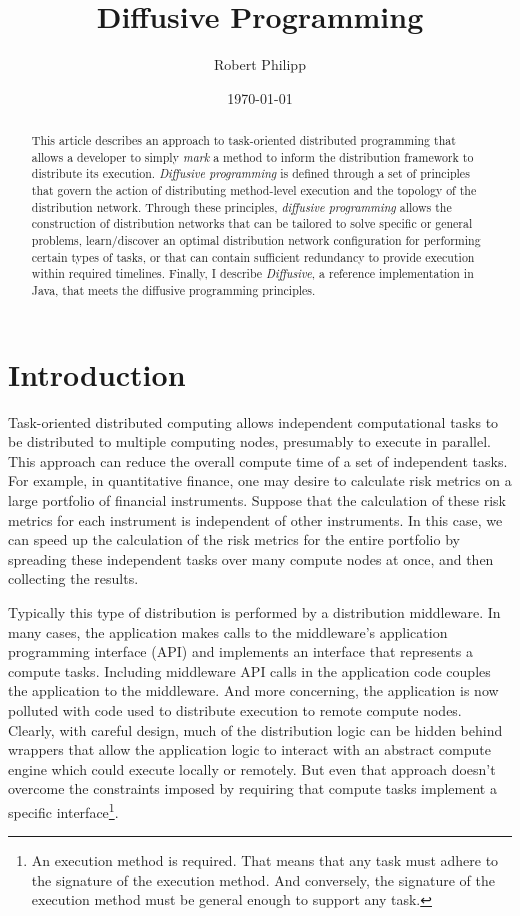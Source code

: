 \documentclass[11pt]{article}
\begin{document}
\title{Diffusive Programming}
\author{Robert Philipp}
\date{\today}
\maketitle

%
%
\begin{abstract}
This article describes an approach to task-oriented distributed programming that allows a developer to simply \emph{mark} a method to inform the distribution framework to distribute its execution. \emph{Diffusive programming} is defined through a set of principles that govern the action of distributing method-level execution and the topology of the distribution network. Through these principles, \emph{diffusive programming} allows the construction of distribution networks that can be tailored to solve specific or general problems,  learn/discover an optimal distribution network configuration for performing certain types of tasks, or that can contain sufficient redundancy to provide execution within required timelines. Finally, I describe \emph{Diffusive}, a reference implementation in Java, that meets the diffusive programming principles.
\end{abstract}

%
%
\section{Introduction}
Task-oriented distributed computing allows independent computational tasks to be distributed to multiple computing nodes, presumably to execute in parallel. This approach can reduce the overall compute time of a set of independent tasks. For example, in quantitative finance, one may desire to calculate risk metrics on a large portfolio of financial instruments. Suppose that the calculation of these risk metrics for each instrument is independent of other instruments. In this case, we can speed up the calculation of the risk metrics for the entire portfolio by spreading these independent tasks over many compute nodes at once, and then collecting the results.

Typically this type of distribution is performed by a distribution middleware. In many cases, the application makes calls to the middleware's application programming interface (API) and implements an interface that represents a compute tasks. Including middleware API calls in the application code couples the application to the middleware. And more concerning, the application is now polluted with code used to distribute execution to remote compute nodes. Clearly, with careful design, much of the distribution logic can be hidden behind wrappers that allow the application logic to interact with an abstract compute engine which could execute locally or remotely. But even that approach doesn't overcome the constraints imposed by requiring that compute tasks implement a specific interface\footnote{An execution method is required. That means that any task must adhere to the signature of the execution method. And conversely, the signature of the execution method must be general enough to support any task.}.
\end{document}
